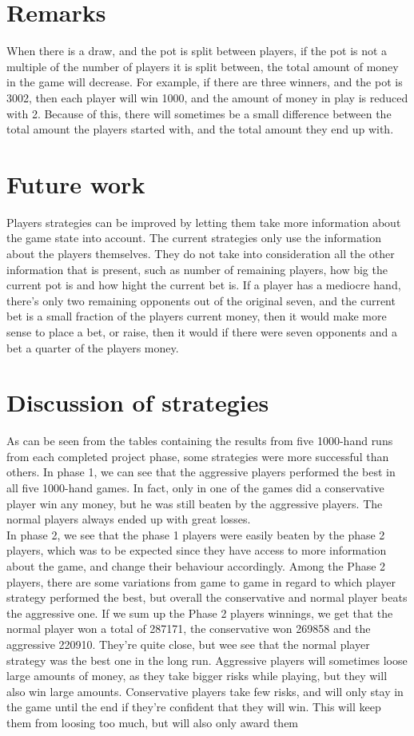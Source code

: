 \documentclass[titlepage]{article}
\begin{document}
\section{Remarks}
    When there is a draw, and the pot is split between players, if the pot is not a multiple of the number of players it is split between, the total amount of money in the game will decrease. For example, if there are three winners, and the pot is 3002, then each player will win 1000, and the amount of money in play is reduced with 2. Because of this, there will sometimes be a small difference between the total amount the players started with, and the total amount they end up with.
    		
\section{Future work}
	Players strategies can be improved by letting them take more information about the game state into account. The current strategies only use the information about the players themselves. They do not take into consideration all the other information that is present, such as number of remaining players, how big the current pot is and how hight the current bet is. If a player has a mediocre hand, there's only two remaining opponents out of the original seven, and the current bet is a small fraction of the players current money, then it would make more sense to place a bet, or raise, then it would if there were seven opponents and a bet a quarter of the players money.
	
\section{Discussion of strategies}
    As can be seen from the tables containing the results from five 1000-hand runs from each completed project phase, some strategies were more successful than others. In phase 1, we can see that the aggressive players performed the best in all five 1000-hand games. In fact, only in one of the games did a conservative player win any money, but he was still beaten by the aggressive players. The normal players always ended up with great losses. \\ In phase 2, we see that the phase 1 players were easily beaten by the phase 2 players, which was to be expected since they have access to more information about the game, and change their behaviour accordingly. Among the Phase 2 players, there are some variations from game to game in regard to which player strategy performed the best, but overall the conservative and normal player beats the aggressive one. If we sum up the Phase 2 players winnings, we get that the normal player won a total of 287171, the conservative won 269858 and the aggressive 220910. They're quite close, but wee see that the normal player strategy was the best one in the long run. Aggressive players will sometimes loose large amounts of money, as they take bigger risks while playing, but they will also win large amounts. Conservative players take few risks, and will only stay in the game until the end if they're confident that they will win. This will keep them from loosing too much, but will also only award them 
\end{document}

